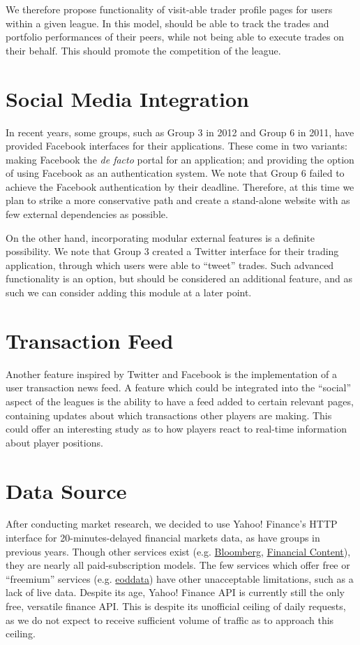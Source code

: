 \documentclass[11pt,letterpaper,oneside]{memoir}
\begin{document}
We therefore propose functionality of visit-able trader profile pages for 
users within a given league. In this model, should be able to track the trades 
and portfolio performances of their peers, while not being able to execute trades 
on their behalf. This should promote the competition of the league.

\section{Social Media Integration}

In recent years, some groups, such as Group 3 in 2012 and Group 6 in 2011, have provided
Facebook interfaces for their applications. These come in two variants: making Facebook
the \emph{de facto} portal for an application; and providing the option of using Facebook
as an authentication system. We note that Group 6 failed to achieve the Facebook authentication
by their deadline. Therefore, at this time we plan to strike a more conservative path and
create a stand-alone website with as few external dependencies as possible.

On the other hand, incorporating modular external features is a definite possibility. We note
that Group 3 created a Twitter interface for their trading application, through which users
were able to ``tweet'' trades. Such advanced functionality is an option, but should be considered
an additional feature, and as such we can consider adding this module at a later point.

\section{Transaction Feed}

Another feature inspired by Twitter and Facebook is the implementation of a user transaction
news feed. A feature which could be integrated into the ``social'' aspect of the leagues
is the ability to have a feed added to certain relevant pages, containing updates about 
which transactions other players are making. This could offer an interesting study as to how
players react to real-time information about player positions.

\section{Data Source}

After conducting market research, we decided to use Yahoo! Finance's HTTP 
interface for 20-minutes-delayed financial markets data, as have groups in 
previous years. Though other services
exist (e.g. 
\href{http://www.bloomberg.com/enterprise/enterprise_products/data_optimization/data_feeds/}{Bloomberg},
\href{http://www.financialcontent.com}{Financial Content}), they are nearly all paid-subscription models. 
The few services which offer free or ``freemium'' services (e.g. 
\href{http://eoddata.com}{eoddata}) have other unacceptable limitations, such as a 
lack of live data. Despite its age, Yahoo! Finance API is currently still the only 
free, versatile finance API. This is despite its unofficial ceiling of daily requests,
as we do not expect to receive sufficient volume of traffic as to approach this ceiling.
\end{document}
